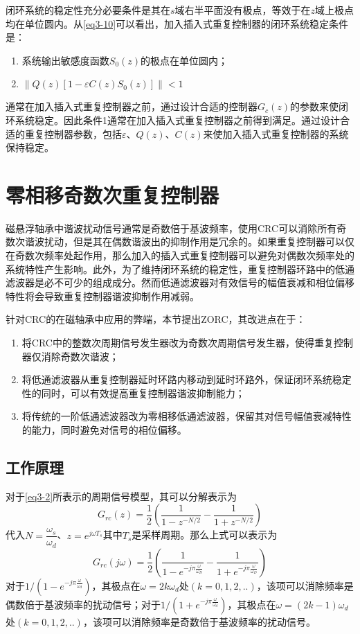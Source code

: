 \documentclass[
  lang=cn,
  degree=master,
  openany,oneside
]{nuaathesis}
\begin{document}
闭环系统的稳定性充分必要条件是其在$s$域右半平面没有极点，等效于在$z$域上极点均在单位圆内。从\autoref{eq3-10}可以看出，加入插入式重复控制器的闭环系统稳定条件是：
\begin{enumerate}
	\item 系统输出敏感度函数$S_0(z)$的极点在单位圆内；
	\item $\left\| Q(z)[1 - \varepsilon C(z)S_0(z)] \right\| < 1$
\end{enumerate}
通常在加入插入式重复控制器之前，通过设计合适的控制器$G_c(z)$的参数来使闭环系统稳定。因此条件1通常在加入插入式重复控制器之前得到满足。通过设计合适的重复控制器参数，包括$\varepsilon$、$Q(z)$、$C(z)$来使加入插入式重复控制器的系统保持稳定。
\section{零相移奇数次重复控制器}
磁悬浮轴承中谐波扰动信号通常是奇数倍于基波频率，使用CRC可以消除所有奇数次谐波扰动，但是其在偶数谐波出的抑制作用是冗余的。如果重复控制器可以仅在奇数次频率处起作用，那么加入的插入式重复控制器可以避免对偶数次频率处的系统特性产生影响。此外，为了维持闭环系统的稳定性，重复控制器环路中的低通滤波器是必不可少的组成成分。然而低通滤波器对有效信号的幅值衰减和相位偏移特性将会导致重复控制器谐波抑制作用减弱。

针对CRC的在磁轴承中应用的弊端，本节提出ZORC，其改进点在于：
\begin{enumerate}
	\item 将CRC中的整数次周期信号发生器改为奇数次周期信号发生器，使得重复控制器仅消除奇数次谐波；
	\item 将低通滤波器从重复控制器延时环路内移动到延时环路外，保证闭环系统稳定性的同时，可以有效提高重复控制器谐波抑制能力；
	\item 将传统的一阶低通滤波器改为零相移低通滤波器，保留其对信号幅值衰减特性的能力，同时避免对信号的相位偏移。
\end{enumerate}
\subsection{工作原理}
对于\autoref{eq3-2}所表示的周期信号模型，其可以分解表示为
\begin{equation}
G_{rc}(z)=\dfrac{1}{2}\left(\dfrac{1}{1-z^{-N/2}}-\dfrac{1}{1+z^{-N/2}}\right)
\end{equation}
代入$N=\dfrac{\omega_s}{\omega_d}$、$z=e^{j\omega T_s}$其中$T_s$是采样周期。那么上式可以表示为
\begin{equation}
G_{rc}(j\omega)=\frac{1}{2}\left(\frac{1}{1-e^{-j\pi\frac{\omega}{\omega_D}}}-\frac{1}{1+e^{-j\pi\frac{\omega}{\omega_D}}}\right)
\end{equation}
对于${1}/\left(1-e^{-j\pi\frac{\omega}{\omega_d}}\right)$，其极点在$\omega=2k\omega_d$处$(k=0,1,2,..)$，该项可以消除频率是偶数倍于基波频率的扰动信号；对于${1}/\left(1+e^{-j\pi\frac{\omega}{\omega_d}}\right)$，其极点在$\omega=(2k-1)\omega_d$处$(k=0,1,2,..)$，该项可以消除频率是奇数倍于基波频率的扰动信号。
\end{document}

